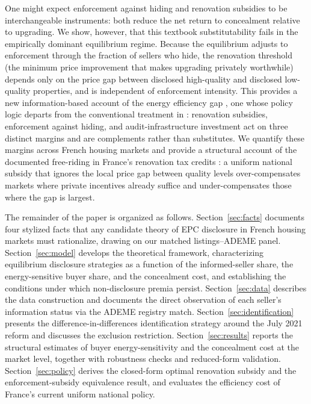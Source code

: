 \documentclass[10pt,letterpaper]{bp-template-concise}
\begin{document}
One might expect enforcement against hiding and renovation subsidies to be interchangeable instruments: both reduce the net return to concealment relative to upgrading. We show, however, that this textbook substitutability fails in the empirically dominant equilibrium regime. Because the equilibrium adjusts to enforcement through the fraction of sellers who hide, the renovation threshold (the minimum price improvement that makes upgrading privately worthwhile) depends only on the price gap between disclosed high-quality and disclosed low-quality properties, and is independent of enforcement intensity. This provides a new information-based account of the energy efficiency gap \citep{allcott_is_2012, gerarden_assessing_2017}, one whose policy logic departs from the conventional treatment in \citet{gillingham_palmer_2014}: renovation subsidies, enforcement against hiding, and audit-infrastructure investment act on three distinct margins and are complements rather than substitutes. We quantify these margins across French housing markets and provide a structural account of the documented free-riding in France's renovation tax credits \citep{nauleau_2014}: a uniform national subsidy that ignores the local price gap between quality levels over-compensates markets where private incentives already suffice and under-compensates those where the gap is largest.

\noindent The remainder of the paper is organized as follows. Section~\ref{sec:facts} documents four stylized facts that any candidate theory of EPC disclosure in French housing markets must rationalize, drawing on our matched listings--ADEME panel. Section~\ref{sec:model} develops the theoretical framework, characterizing equilibrium disclosure strategies as a function of the informed-seller share, the energy-sensitive buyer share, and the concealment cost, and establishing the conditions under which non-disclosure premia persist. Section~\ref{sec:data} describes the data construction and documents the direct observation of each seller's information status via the ADEME registry match. Section~\ref{sec:identification} presents the difference-in-differences identification strategy around the July 2021 reform and discusses the exclusion restriction. Section~\ref{sec:results} reports the structural estimates of buyer energy-sensitivity and the concealment cost at the market level, together with robustness checks and reduced-form validation. Section~\ref{sec:policy} derives the closed-form optimal renovation subsidy and the enforcement-subsidy equivalence result, and evaluates the efficiency cost of France's current uniform national policy.
\end{document}

